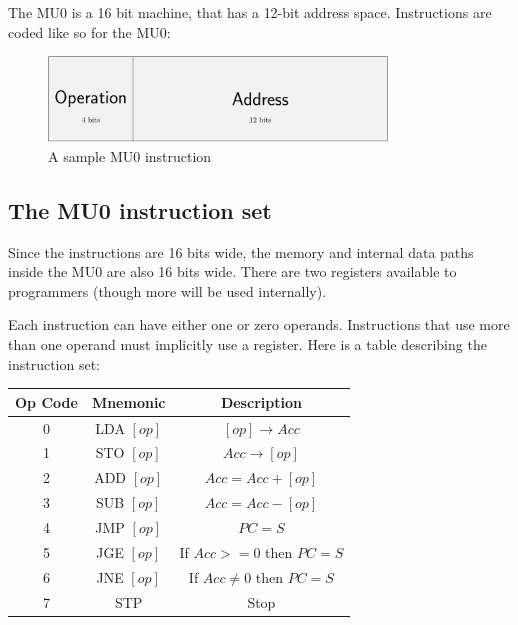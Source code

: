 \documentclass{article}
\begin{document}
The MU0 is a 16 bit machine, that has a 12-bit address space. Instructions are
coded like so for the MU0:

\begin{figure}[ht!]
	\centering
	\includegraphics[width=90mm]{instruction_format.pdf}
	\caption{A sample MU0 instruction}
	\label{overflow}
\end{figure}

\subsection{The MU0 instruction set}

Since the instructions are 16 bits wide, the memory and internal data paths
inside the MU0 are also 16 bits wide. There are two registers available to
programmers (though more will be used internally).

Each instruction can have either one or zero operands. Instructions that use
more than one operand must implicitly use a register. Here is a table describing
the instruction set:


\begin{center}
	\begin{tabular}{|c|c|c|}
		\hline
		{\bf Op Code} & {\bf Mnemonic} & {\bf Description}\\ \hline
		0 & LDA $[op]$ & $[op] \rightarrow Acc$\\ \hline
		1 & STO $[op]$ & $Acc \rightarrow [op]$\\ \hline
		2 & ADD $[op]$ & $Acc = Acc + [op]$\\ \hline
		3 & SUB $[op]$ & $Acc = Acc - [op]$\\ \hline
		4 & JMP $[op]$ & $PC = S$\\ \hline
		5 & JGE $[op]$ & If $Acc >= 0$ then $PC = S$\\ \hline
		6 & JNE $[op]$ & If $Acc \not= 0$ then $PC = S$\\ \hline
		7 & STP & Stop\\ \hline
	\end{tabular}
\end{center}
\end{document}

